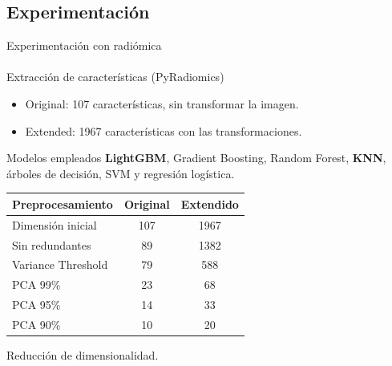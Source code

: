 \documentclass{beamer}
\begin{document}
\subsection{Experimentación}
\begin{frame}{Experimentación con radiómica}
\framesubtitle{\insertsubsectionhead}

\begin{block}{Extracción de características (PyRadiomics)}
\begin{itemize}
    \item Original: 107 características, sin transformar la imagen.
    \item Extended: 1967 características con las transformaciones.
\end{itemize}
\end{block}


\begin{block}{Modelos empleados}
\textbf{LightGBM}, Gradient Boosting, Random Forest, \textbf{KNN}, árboles de decisión, SVM y regresión logística.
\end{block}

 \vspace{0.5em}

\centering
\footnotesize
\begin{tabular}{lcc}
\toprule
\textbf{Preprocesamiento}& \textbf{Original} & \textbf{Extendido} \\
\midrule
Dimensión inicial       & 107 & 1967 \\
Sin redundantes         & 89  & 1382 \\
Variance Threshold      & 79  & 588  \\
PCA 99\%                & 23  & 68   \\
PCA 95\%                & 14  & 33   \\
PCA 90\%                & 10  & 20   \\
\bottomrule
\end{tabular}

\vspace{0.5em}
{\scriptsize Reducción de dimensionalidad.}

\end{frame}
\end{document}
